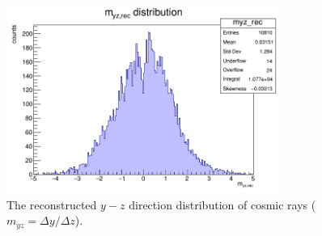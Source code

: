 \begin{figure}[!h]
    \centering
    \includegraphics[width=0.8\textwidth]{figures/png/myz_rec.png}
    \caption{The reconstructed $y-z$ direction distribution of cosmic rays ($m_{yz}=\Delta y /\Delta z$).}
    \label{fig:myzrec}
\end{figure}











